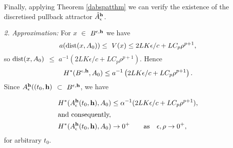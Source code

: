 \begin{prf}
Finally, applying Theorem \ref{dabspatthm} we can verify the existence of the
discretised pullback attractor $\hat{A}^{{\bf h }}_{\epsilon}$.

  {\em 2. Approximation:}
  For $x$ $\in$ $B^{\epsilon,{\bf h}}$ we have
  \[ a({\rm dist}(x,A_0)) \leq \ V(x) \leq 2LK \epsilon /c +
                                               LC_{p}\rho^{p+1}, \]
  so ${\rm dist}(x,A_0)$ $\leq$ $a^{-1}\left(2L K \epsilon /c +
  LC_{p}\rho^{p+1} \right)$. Hence
  \[  H^{*}(B^{\epsilon,{\bf h}},A_0) \leq a^{-1}\left(2LK \epsilon /c +
                                       LC_{p}\rho^{p+1} \right). \]
  Since $A^{\bf h}_{\epsilon}((t_0, {\bf h})$ $\subset$ $B^{\epsilon,{\bf
  h}}$, we have

  \begin{align*}
    H^{*}(A^{{\bf h}}_{\epsilon}(t_0, {\bf h}), A_0) &\leq \alpha^{-1}(2L
            K \epsilon /c + LC_{p}\rho^{p+1}), \\
  \intertext{and consequently,}
    H^{*}(A^{{\bf h}}_{\epsilon}(t_0, {\bf h}), A_0) &\to 0^+ \qquad \text{as}
\quad \epsilon,\rho \to 0^+,\\
\end{align*}
  for arbitrary $t_0$.
\end{prf}

\endinput
